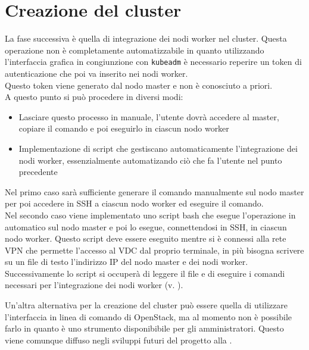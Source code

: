 \documentclass[12pt,a4paper,openright,twoside]{book}
\begin{document}
\section{Creazione del cluster}
\label{sec:cluster-creation}
La fase successiva è quella di integrazione dei nodi worker nel cluster. Questa operazione non è completamente automatizzabile in quanto utilizzando
l'interfaccia grafica in congiunzione con \texttt{kubeadm} è necessario reperire un token di autenticazione che poi va inserito nei nodi worker.\\
Questo token viene generato dal nodo master e non è conosciuto a priori.\\
A questo punto si può procedere in diversi modi:
\begin{itemize}
    \item Lasciare questo processo in manuale, l'utente dovrà accedere al master, copiare il comando e poi eseguirlo in ciascun nodo worker
    \item Implementazione di script che gestiscano automaticamente l'integrazione dei nodi worker, essenzialmente automatizando ciò che fa l'utente nel punto precedente
\end{itemize}
Nel primo caso sarà sufficiente generare il comando manualmente sul nodo master per poi accedere in SSH a ciascun nodo worker ed eseguire il comando.\\
Nel secondo caso viene implementato uno script bash che esegue l'operazione in automatico sul nodo master e poi lo esegue, connettendosi in SSH, in ciascun nodo worker. 
Questo script deve essere eseguito mentre si è connessi alla rete VPN che permette l'accesso al VDC dal proprio terminale, in più bisogna scrivere su un file di testo l'indirizzo IP del nodo master e dei nodi worker.
Successivamente lo script si occuperà di leggere il file e di eseguire i comandi necessari per l'integrazione dei nodi worker (v. ).


Un'altra alternativa per la creazione del cluster può essere quella di utilizzare l'interfaccia in linea di comando di OpenStack, ma al momento non è possibile farlo 
in quanto è uno strumento disponibibile per gli amministratori. Questo viene comunque diffuso negli sviluppi futuri del progetto alla .
\end{document}
